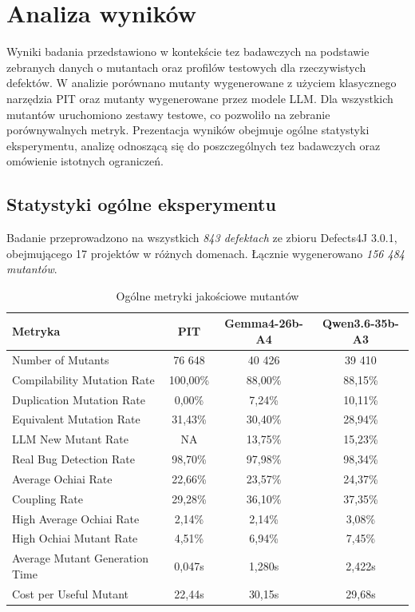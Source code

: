 \documentclass[12pt,a4paper,oldfontcommands]{memoir}
\theoremstyle{plain}
\theoremstyle{definition}
\theoremstyle{remark}
\begin{document}
    \clearpage
    \openany
    \chapter{Analiza wyników}
    \openright

    Wyniki badania przedstawiono w kontekście tez badawczych na podstawie zebranych danych o mutantach oraz profilów testowych dla rzeczywistych defektów.
    W analizie porównano mutanty wygenerowane z użyciem klasycznego narzędzia PIT oraz mutanty wygenerowane przez modele LLM.
    Dla wszystkich mutantów uruchomiono zestawy testowe, co pozwoliło na zebranie porównywalnych metryk.
    Prezentacja wyników obejmuje ogólne statystyki eksperymentu, analizę odnoszącą się do poszczególnych tez badawczych oraz omówienie istotnych ograniczeń.

    \section{Statystyki ogólne eksperymentu}

    Badanie przeprowadzono na wszystkich \textit{843 defektach} ze zbioru Defects4J 3.0.1, obejmującego 17 projektów w różnych domenach.
    Łącznie wygenerowano \textit{156 484 mutantów}.

    \begin{table}[H]
        \centering
        \small
        \begin{tabular}{|l|c|c|c|}
            \hline
            Metryka & PIT & Gemma4-26b-A4 & Qwen3.6-35b-A3 \\ \hline
            Number of Mutants & 76 648 & 40 426 & 39 410 \\ \hline
            Compilability Mutation Rate & 100,00\% & 88,00\% & 88,15\% \\ \hline
            Duplication Mutation Rate & 0,00\% & 7,24\% & 10,11\% \\ \hline
            Equivalent Mutation Rate & 31,43\% & 30,40\% & 28,94\% \\ \hline
            LLM New Mutant Rate & NA & 13,75\% & 15,23\% \\ \hline
            Real Bug Detection Rate & 98,70\% & 97,98\% & 98,34\% \\ \hline
            Average Ochiai Rate & 22,66\% & 23,57\% & 24,37\% \\ \hline
            Coupling Rate & 29,28\% & 36,10\% & 37,35\% \\ \hline
            High Average Ochiai Rate & 2,14\% & 2,14\% & 3,08\% \\ \hline
            High Ochiai Mutant Rate & 4,51\% & 6,94\% & 7,45\% \\ \hline
            Average Mutant Generation Time & 0,047s & 1,280s & 2,422s \\ \hline
            Cost per Useful Mutant & 22,44s & 30,15s & 29,68s \\ \hline
        \end{tabular}
        \caption{Ogólne metryki jakościowe mutantów}
        \label{tab:ogolne}
    \end{table}
\end{document}
